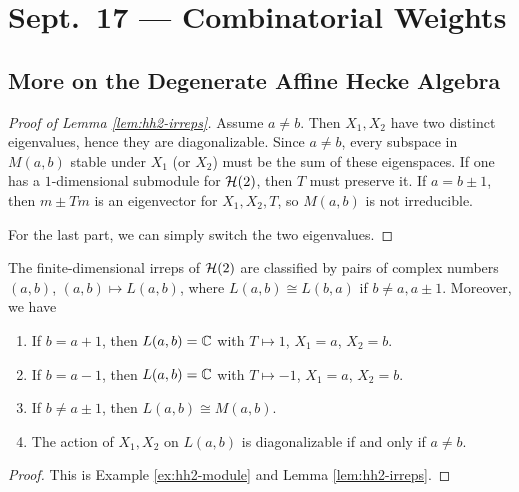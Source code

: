 \chapter{Sept.~17 --- Combinatorial Weights}

\section{More on the Degenerate Affine Hecke Algebra}

\begin{proof}[Proof of Lemma \ref{lem:hh2-irreps}]
  Assume $a \ne b$. Then $X_1, X_2$
  have two distinct eigenvalues, hence
  they are diagonalizable.
  Since $a \ne b$, every subspace in
  $M(a, b)$ stable under
  $X_1$ (or $X_2$) must be the sum
  of these eigenspaces. If
  one has a $1$-dimensional
  submodule for $\mathcal{H}(2)$, then
  $T$ must preserve it. If
  $a = b \pm 1$, then $m \pm Tm$ is an
  eigenvector for $X_1, X_2, T$, so
  $M(a, b)$ is not irreducible.

  For the last part, we can simply
  switch the two eigenvalues.
\end{proof}

\begin{prop}
  The finite-dimensional irreps of
  $\mathcal{H}(2)$ are classified by
  pairs of complex numbers $(a, b)$,
  $(a, b) \mapsto L(a, b)$, where
  $L(a, b) \cong L(b, a)$ if $b \ne a, a \pm 1$.
  Moreover, we have
  \begin{enumerate}
    \item If $b = a + 1$, then
      $L(a, b) = \mathbb{C}$ with
      $T \mapsto 1$, $X_1 = a$, $X_2 = b$.
    \item If $b = a - 1$, then
      $L(a, b) = \mathbb{C}$ with
      $T \mapsto -1$, $X_1 = a$, $X_2 = b$.
    \item If $b \ne a \pm 1$, then
      $L(a, b) \cong M(a, b)$.
    \item The action of $X_1, X_2$
      on $L(a, b)$ is diagonalizable
      if and only if $a \ne b$.
  \end{enumerate}
\end{prop}

\begin{proof}
  This is Example
  \ref{ex:hh2-module} and
  Lemma \ref{lem:hh2-irreps}.
\end{proof}

